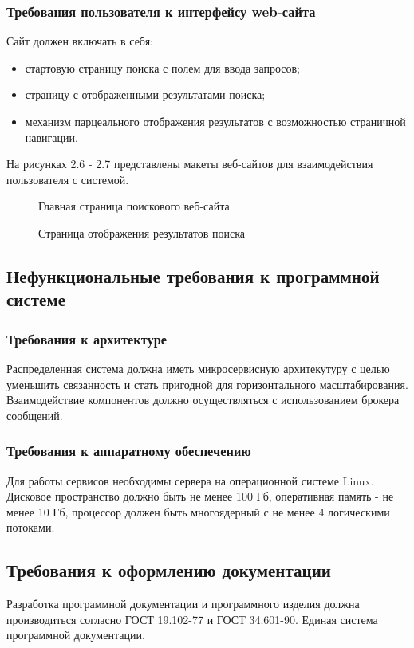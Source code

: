 \subsubsection{Требования пользователя к интерфейсу web-сайта}

Сайт должен включать в себя:
\begin{itemize}
	\item стартовую страницу поиска с полем для ввода запросов;
	\item страницу с отображенными результатами поиска;
	\item механизм парцеального отображения результатов с возможностью страничной навигации.
\end{itemize}

На рисунках 2.6 - 2.7 представлены макеты веб-сайтов для взаимодействия пользователя с системой.
\begin{figure}
\caption{Главная страница поискового веб-сайта}
\label{site_main:image}
\end{figure}
\begin{figure}
\caption{Страница отображения результатов поиска}
\label{site_search:image}
\end{figure}

\subsection{Нефункциональные требования к программной системе}

\subsubsection{Требования к архитектуре}

Распределенная система должна иметь микросервисную архитекутуру с целью уменьшить связанность и стать пригодной для горизонтального масштабирования. Взаимодействие компонентов должно осуществляться с использованием брокера сообщений.

\subsubsection{Требования к аппаратному обеспечению}

Для работы сервисов необходимы сервера на операционной системе Linux. Дисковое пространство должно быть не менее 100 Гб, оперативная память  - не менее 10 Гб, процессор должен быть многоядерный с не менее 4 логическими потоками.

\subsection{Требования к оформлению документации}

Разработка программной документации и программного изделия должна производиться согласно ГОСТ 19.102-77 и ГОСТ 34.601-90. Единая система программной документации.
